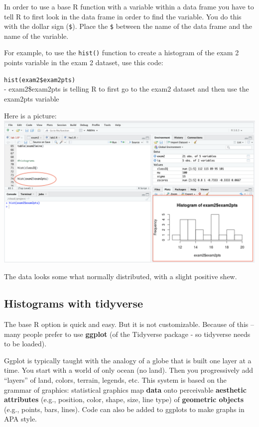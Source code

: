 \documentclass[
]{book}
\begin{document}
In order to use a base R function with a variable within a data frame you have to tell R to first look in the data frame in order to find the variable. You do this with the dollar sign (\texttt{\$}). Place the \texttt{\$} between the name of the data frame and the name of the variable.

For example, to use the \texttt{hist()} function to create a histogram of the exam 2 points variable in the exam 2 dataset, use this code:

\texttt{hist(exam2\$exam2pts)}\\
- exam2\$exam2pts is telling R to first go to the exam2 dataset and then use the exam2pts variable

Here is a picture:\\
\includegraphics{img/basehist2.png}

The data looks some what normally distributed, with a slight positive shew.

\hypertarget{histograms-with-tidyverse}{%
\subsection{Histograms with tidyverse}\label{histograms-with-tidyverse}}

The base R option is quick and easy. But it is not customizable. Because of this -- many people prefer to use \textbf{ggplot} (of the Tidyverse package - so tidyverse needs to be loaded).

Ggplot is typically taught with the analogy of a globe that is built one layer at a time. You start with a world of only ocean (no land). Then you progressively add ``layers'' of land, colors, terrain, legends, etc. This system is based on the grammar of graphics: statistical graphics map \textbf{data} onto perceivable \textbf{aesthetic attributes} (e.g., position, color, shape, size, line type) of \textbf{geometric objects} (e.g., points, bars, lines). Code can also be added to ggplots to make graphs in APA style.
\end{document}
